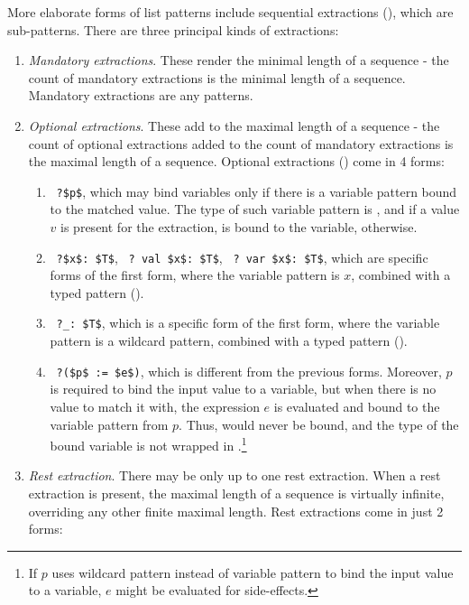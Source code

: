 More elaborate forms of list patterns include sequential extractions (), which are sub-patterns. There are three principal kinds of extractions:
\begin{enumerate}
  \item {\em Mandatory extractions}. These render the minimal length of a sequence - the count of mandatory extractions is the minimal length of a sequence. Mandatory extractions are any patterns. 
  \item {\em Optional extractions}. These add to the maximal length of a sequence - the count of optional extractions added to the count of mandatory extractions is the maximal length of a sequence. Optional extractions () come in 4 forms:
    \begin{enumerate}
      \item ~\lstinline!?$p$!, which may bind variables only if there is a variable pattern bound to the matched value. The type of such variable pattern is , and if a value $v$ is present for the extraction,  is bound to the variable,  otherwise. 
      \item ~\lstinline!?$x$: $T$!, ~\lstinline!? val $x$: $T$!, ~\lstinline!? var $x$: $T$!, which are specific forms of the first form, where the variable pattern is $x$, combined with a typed pattern (). 
      \item ~\lstinline!?_: $T$!, which is a specific form of the first form, where the variable pattern is a wildcard pattern, combined with a typed pattern (). 
      \item ~\lstinline!?($p$ := $e$)!, which is different from the previous forms. Moreover, $p$ is required to bind the input value to a variable, but when there is no value to match it with, the expression $e$ is evaluated and bound to the variable pattern from $p$. Thus,  would never be bound, and the type of the bound variable is not wrapped in .\footnote{If $p$ uses wildcard pattern instead of variable pattern to bind the input value to a variable, $e$ might be evaluated for side-effects.} 
    \end{enumerate}
  \item {\em Rest extraction}. There may be only up to one rest extraction. When a rest extraction is present, the maximal length of a sequence is virtually infinite, overriding any other finite maximal length. Rest extractions come in just 2 forms:
    \begin{enumerate}

\end{enumerate}
\end{enumerate}
